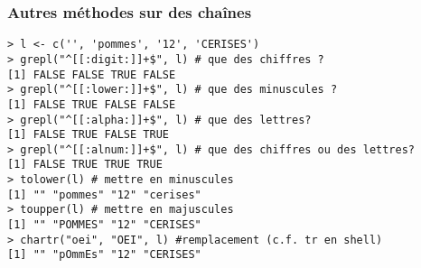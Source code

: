 \documentclass[10pt]{beamer}
\begin{document}
\begin{frame}[fragile]
  \frametitle{Autres méthodes sur des chaînes}
  \begin{lstlisting}
> l <- c('', 'pommes', '12', 'CERISES')
> grepl("^[[:digit:]]+$", l) # que des chiffres ?
[1] FALSE FALSE TRUE FALSE
> grepl("^[[:lower:]]+$", l) # que des minuscules ?
[1] FALSE TRUE FALSE FALSE
> grepl("^[[:alpha:]]+$", l) # que des lettres?
[1] FALSE TRUE FALSE TRUE
> grepl("^[[:alnum:]]+$", l) # que des chiffres ou des lettres?
[1] FALSE TRUE TRUE TRUE 
> tolower(l) # mettre en minuscules
[1] "" "pommes" "12" "cerises"
> toupper(l) # mettre en majuscules
[1] "" "POMMES" "12" "CERISES"
> chartr("oei", "OEI", l) #remplacement (c.f. tr en shell) 
[1] "" "pOmmEs" "12" "CERISES"
  \end{lstlisting}
\end{frame}
\end{document}
